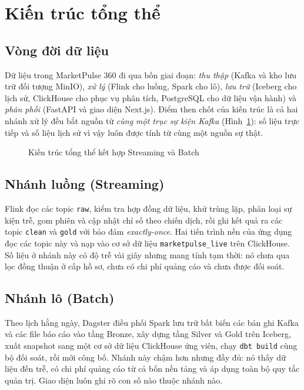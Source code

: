 \section{Kiến trúc tổng thể}
\label{sec:c2-kien-truc}

\subsection{Vòng đời dữ liệu}
\label{sec:c2-vong-doi}
Dữ liệu trong MarketPulse 360 đi qua bốn giai đoạn: \emph{thu thập} (Kafka và kho lưu trữ đối tượng MinIO), \emph{xử lý} (Flink cho luồng, Spark cho lô), \emph{lưu trữ} (Iceberg cho lịch sử, ClickHouse cho phục vụ phân tích, PostgreSQL cho dữ liệu vận hành) và \emph{phân phối} (FastAPI và giao diện Next.js). Điểm then chốt của kiến trúc là cả hai nhánh xử lý đều bắt nguồn từ \emph{cùng một trục sự kiện Kafka} (Hình~\ref{fig:architecture}): số liệu trực tiếp và số liệu lịch sử vì vậy luôn được tính từ cùng một nguồn sự thật.

\begin{figure}[H]
    \centering
    \resizebox{\textwidth}{!}{}
    \caption{Kiến trúc tổng thể kết hợp Streaming và Batch}
    \label{fig:architecture}
\end{figure}

\subsection{Nhánh luồng (Streaming)}
\label{sec:c2-streaming}
Flink đọc các topic \texttt{raw}, kiểm tra hợp đồng dữ liệu, khử trùng lặp, phân loại sự kiện trễ, gom phiên và cập nhật chỉ số theo chiến dịch, rồi ghi kết quả ra các topic \texttt{clean} và \texttt{gold} với bảo đảm \emph{exactly-once}. Hai tiến trình nền của ứng dụng đọc các topic này và nạp vào cơ sở dữ liệu \texttt{marketpulse\_live} trên ClickHouse. Số liệu ở nhánh này có độ trễ vài giây nhưng mang tính tạm thời: nó chưa qua lọc đồng thuận ở cấp hồ sơ, chưa có chi phí quảng cáo và chưa được đối soát.

\subsection{Nhánh lô (Batch)}
\label{sec:c2-batch}
Theo lịch hằng ngày, Dagster điều phối Spark lưu trữ bất biến các bản ghi Kafka và các file báo cáo vào tầng Bronze, xây dựng tầng Silver và Gold trên Iceberg, xuất snapshot sang một cơ sở dữ liệu ClickHouse ứng viên, chạy \texttt{dbt build} cùng bộ đối soát, rồi mới công bố. Nhánh này chậm hơn nhưng đầy đủ: nó thấy dữ liệu đến trễ, có chi phí quảng cáo từ cả bốn nền tảng và áp dụng toàn bộ quy tắc quản trị. Giao diện luôn ghi rõ con số nào thuộc nhánh nào.

